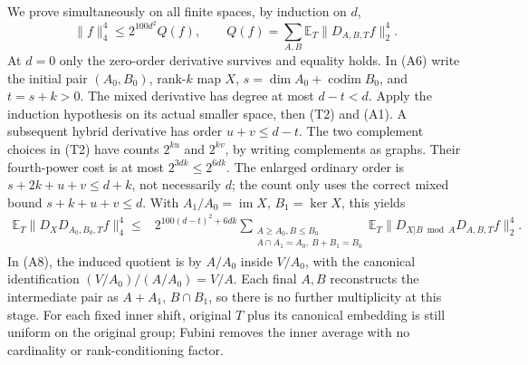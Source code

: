 We prove simultaneously on all finite spaces, by induction on $d$,
\[
 \|f\|_4^4\le2^{100d^2}Q(f),\qquad
 Q(f)=\sum_{A,B}\mathbb E_T\|D_{A,B,T}f\|_2^4.       \tag{A7}
\]
At $d=0$ only the zero-order derivative survives and equality holds.
In (A6) write the initial pair $(A_0,B_0)$, rank-$k$ map $X$,
$s=\dim A_0+\operatorname{codim}B_0$, and $t=s+k>0$.
The mixed derivative has degree at most $d-t<d$. Apply the induction
hypothesis on its actual smaller space, then (T2) and (A1).
A subsequent hybrid derivative has order $u+v\le d-t$.
The two complement choices in (T2) have counts $2^{ku}$ and $2^{kv}$,
by writing complements as graphs. Their fourth-power cost is at most
$2^{3dk}\le2^{6dk}$. The enlarged ordinary order is
$s+2k+u+v\le d+k$, not necessarily $d$; the count only uses the correct
mixed bound $s+k+u+v\le d$.
With $A_1/A_0=\operatorname{im}X$, $B_1=\ker X$, this yields
\[
 \begin{split}
 \mathbb E_T\|D_XD_{A_0,B_0,T}f\|_4^4
 \le {}&2^{100(d-t)^2+6dk}
 \sum_{\substack{A\ge A_0,B\le B_0\\
                 A\cap A_1=A_0,\ B+B_1=B_0}}
 \mathbb E_T\|D_{X|B\bmod A}D_{A,B,T}f\|_2^4.       \end{split}\tag{A8}
\]
In (A8), the induced quotient is by $A/A_0$ inside $V/A_0$,
with the canonical identification $(V/A_0)/(A/A_0)=V/A$.
Each final $A,B$ reconstructs the intermediate pair as $A+A_1$,
$B\cap B_1$, so there is no further multiplicity at this stage.
For each fixed inner shift, original $T$ plus its canonical embedding
is still uniform on the original group; Fubini removes the inner
average with no cardinality or rank-conditioning factor.

